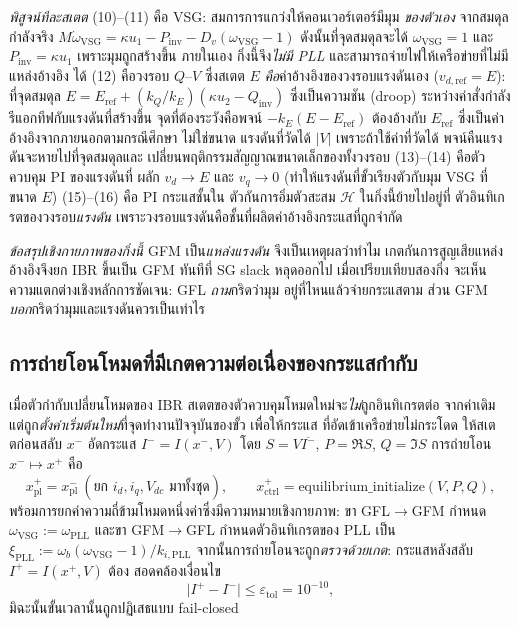 \documentclass[12pt,a4paper]{article}
\begin{document}
\emph{พิสูจน์ทีละสเตต} (10)--(11) คือ VSG: สมการการแกว่งให้คอนเวอร์เตอร์มีมุม
\emph{ของตัวเอง} จากสมดุลกำลังจริง $M\dot\omega_{\mathrm{VSG}}
=\kappa u_1-P_{\mathrm{inv}}-D_v(\omega_{\mathrm{VSG}}-1)$ ดังนั้นที่จุดสมดุลจะได้
$\omega_{\mathrm{VSG}}=1$ และ $P_{\mathrm{inv}}=\kappa u_1$ เพราะมุมถูกสร้างขึ้น
ภายในเอง กิ่งนี้จึง\emph{ไม่มี PLL} และสามารถจ่ายไฟให้เครือข่ายที่ไม่มีแหล่งอ้างอิง
ได้ (12) คือวงรอบ $Q$--$V$ ซึ่งสเตต $E$ \emph{คือ}ค่าอ้างอิงของวงรอบแรงดันเอง
($v_{d,\mathrm{ref}}=E$): ที่จุดสมดุล $E=E_{\mathrm{ref}}
+(k_Q/k_E)(\kappa u_2-Q_{\mathrm{inv}})$ ซึ่งเป็นความชัน (droop) ระหว่างค่าสั่งกำลัง
รีแอกทีฟกับแรงดันที่สร้างขึ้น จุดที่ต้องระวังคือพจน์ $-k_E(E-E_{\mathrm{ref}})$
ต้องอ้างกับ $E_{\mathrm{ref}}$ ซึ่งเป็นค่าอ้างอิงจากภายนอกตามกรณีศึกษา ไม่ใช่ขนาด
แรงดันที่วัดได้ $|V|$ เพราะถ้าใช้ค่าที่วัดได้ พจน์คืนแรงดันจะหายไปที่จุดสมดุลและ
เปลี่ยนพฤติกรรมสัญญาณขนาดเล็กของทั้งวงรอบ (13)--(14) คือตัวควบคุม PI ของแรงดันที่
ผลัก $v_d\to E$ และ $v_q\to 0$ (ทำให้แรงดันที่ขั้วเรียงตัวกับมุม VSG ที่ขนาด $E$)
(15)--(16) คือ PI กระแสชั้นใน ตัวกันการอิ่มตัวสะสม $\mathcal H$ ในกิ่งนี้ย้ายไปอยู่ที่
ตัวอินทิเกรตของวงรอบ\emph{แรงดัน} เพราะวงรอบแรงดันคือชั้นที่ผลิตค่าอ้างอิงกระแสที่ถูกจำกัด

\emph{ข้อสรุปเชิงกายภาพของกิ่งนี้} GFM เป็น\emph{แหล่งแรงดัน} จึงเป็นเหตุผลว่าทำไม
เกตกันการสูญเสียแหล่งอ้างอิงจึงยก IBR ขึ้นเป็น GFM ทันทีที่ SG slack หลุดออกไป
เมื่อเปรียบเทียบสองกิ่ง จะเห็นความแตกต่างเชิงหลักการชัดเจน: GFL \emph{ถาม}กริดว่ามุม
อยู่ที่ไหนแล้วจ่ายกระแสตาม ส่วน GFM \emph{บอก}กริดว่ามุมและแรงดันควรเป็นเท่าไร

\subsection{การถ่ายโอนโหมดที่มีเกตความต่อเนื่องของกระแสกำกับ}\label{sec:transfer}
เมื่อตัวกำกับเปลี่ยนโหมดของ IBR สเตตของตัวควบคุมโหมดใหม่จะ\emph{ไม่}ถูกอินทิเกรตต่อ
จากค่าเดิม แต่ถูก\emph{ตั้งค่าเริ่มต้นใหม่}ที่จุดทำงานปัจจุบันของขั้ว เพื่อให้กระแส
ที่อัดเข้าเครือข่ายไม่กระโดด ให้สเตตก่อนสลับ $x^{-}$ อัดกระแส $I^{-}=I(x^{-},V)$
โดย $S=V\overline{I^{-}}$, $P=\Re S$, $Q=\Im S$ การถ่ายโอน $x^{-}\mapsto x^{+}$ คือ
\begin{equation}
  x^{+}_{\mathrm{pl}}=x^{-}_{\mathrm{pl}}\ (\text{ยก }i_d,i_q,V_{dc}\text{ มาทั้งชุด}),\qquad
  x^{+}_{\mathrm{ctrl}}=\text{equilibrium\_initialize}(V,P,Q),
  \label{eq:transfer}
\end{equation}
พร้อมการยกค่าความถี่ข้ามโหมดหนึ่งค่าซึ่งมีความหมายเชิงกายภาพ: ขา
GFL$\to$GFM กำหนด $\omega_{\mathrm{VSG}}\!:=\!\omega_{\mathrm{PLL}}$ และขา
GFM$\to$GFL กำหนดตัวอินทิเกรตของ PLL เป็น
$\xi_{\mathrm{PLL}}\!:=\!\omega_b(\omega_{\mathrm{VSG}}-1)/k_{i,\mathrm{PLL}}$
จากนั้นการถ่ายโอนจะถูก\emph{ตรวจด้วยเกต}: กระแสหลังสลับ $I^{+}=I(x^{+},V)$ ต้อง
สอดคล้องเงื่อนไข
\begin{equation}
  \bigl|I^{+}-I^{-}\bigr|\le\varepsilon_{\mathrm{tol}}=10^{-10},
  \label{eq:contgate}
\end{equation}
มิฉะนั้นขั้นเวลานั้นถูกปฏิเสธแบบ fail-closed
\end{document}
